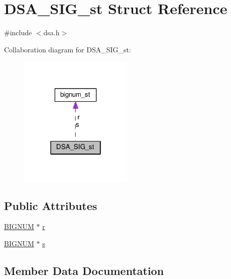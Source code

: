 \hypertarget{struct_d_s_a___s_i_g__st}{}\section{D\+S\+A\+\_\+\+S\+I\+G\+\_\+st Struct Reference}
\label{struct_d_s_a___s_i_g__st}


{\ttfamily \#include $<$dsa.\+h$>$}



Collaboration diagram for D\+S\+A\+\_\+\+S\+I\+G\+\_\+st\+:
\nopagebreak
\begin{figure}[H]
\begin{center}
\leavevmode
\includegraphics[width=154pt]{struct_d_s_a___s_i_g__st__coll__graph}
\end{center}
\end{figure}
\subsection*{Public Attributes}
\begin{DoxyCompactItemize}
\item 
\hyperlink{ossl__typ_8h_a6fb19728907ec6515e4bfb716bffa141}{B\+I\+G\+N\+UM} $\ast$ \hyperlink{struct_d_s_a___s_i_g__st_a745899b460d408e175d9adee66ef046e}{r}
\item 
\hyperlink{ossl__typ_8h_a6fb19728907ec6515e4bfb716bffa141}{B\+I\+G\+N\+UM} $\ast$ \hyperlink{struct_d_s_a___s_i_g__st_ae7c55f852d6ca0b46b5d5c99dcfb8c2d}{s}
\end{DoxyCompactItemize}


\subsection{Member Data Documentation}
